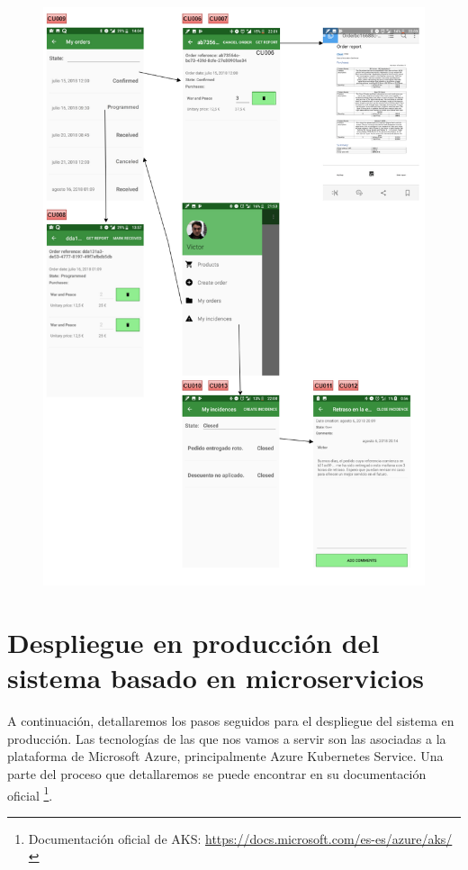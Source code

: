 \documentclass[11pt,spanish,listoffigures]{tfgetsinf}
\begin{document}
\begin{figure}[h]
\centering
\includegraphics[scale=0.8]{ModeloUI2}
\end{figure}

%

\chapter{Despliegue en producción del sistema basado en microservicios} \label{chap:Despliegue}

A continuación, detallaremos los pasos seguidos para el despliegue del sistema en producción. Las tecnologías de las que nos vamos a servir son las asociadas a la plataforma de Microsoft Azure, principalmente Azure Kubernetes Service. Una parte del proceso que detallaremos se puede encontrar en su documentación oficial \footnote{ Documentación oficial de AKS: \url{https://docs.microsoft.com/es-es/azure/aks/}}.
\end{document}
